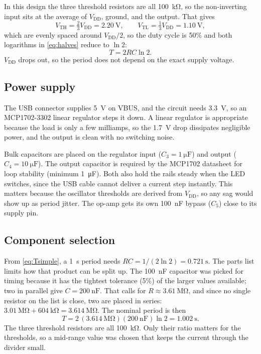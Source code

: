 \documentclass[11pt]{article}
\newcommand{\Vdd}{V_{\text{DD}}}
\newcommand{\Vth}{V_{\text{TH}}}
\newcommand{\Vtl}{V_{\text{TL}}}
\begin{document}
In this design the three threshold resistors are all \qty{100}{\kilo\ohm},
so the non-inverting input sits at the average of $\Vdd$, ground, and the
output. That gives
\begin{equation}
  \Vth = \tfrac{2}{3}\Vdd = \qty{2.20}{\volt}, \qquad
  \Vtl = \tfrac{1}{3}\Vdd = \qty{1.10}{\volt},
  \label{eq:thresholds}
\end{equation}
which are evenly spaced around $\Vdd/2$, so the duty cycle is
50\% and both logarithms in \cref{eq:halves} reduce to
$\ln 2$:
\begin{equation}
  T = 2RC\ln 2 .
  \label{eq:Tsimple}
\end{equation}
$\Vdd$ drops out, so the period does not depend on the exact supply
voltage.

\subsection{Power supply}
\label{sec:power}
The USB connector supplies \qty{5}{\volt} on VBUS, and the circuit needs
\qty{3.3}{\volt}, so an MCP1702-3302 linear regulator steps it down. A
linear regulator is appropriate because the load is only a few
milliamps, so the \qty{1.7}{\volt} drop dissipates negligible power, and
the output is clean with no switching noise.

Bulk capacitors are placed on the regulator input ($C_3 =
\qty{1}{\micro\farad}$) and output ($C_4 = \qty{10}{\micro\farad}$). The
output capacitor is required by the MCP1702 datasheet for loop stability
(minimum \qty{1}{\micro\farad}). Both also hold the rails steady when the
LED switches, since the USB cable cannot deliver a current step instantly.
This matters because the oscillator thresholds are derived from $\Vdd$,
so any sag would show up as period jitter. The op-amp gets its own
\qty{100}{\nano\farad} bypass ($C_5$) close to its supply pin.

\subsection{Component selection}
\label{sec:components}
From \cref{eq:Tsimple}, a \qty{1}{\s} period needs $RC = 1/(2\ln 2) =
\qty{0.721}{\s}$. The parts list limits how that product can be split up.
The \qty{100}{\nano\farad} capacitor was picked for timing because it has
the tightest tolerance (5\%) of the larger values available;
two in parallel give $C = \qty{200}{\nano\farad}$. That calls for
$R \approx \qty{3.61}{\mega\ohm}$, and since no single resistor on the list
is close, two are placed in series: $\qty{3.01}{\mega\ohm} +
\qty{604}{\kilo\ohm} = \qty{3.614}{\mega\ohm}$. The nominal period is then
\begin{equation}
  T = 2\,(\qty{3.614}{\mega\ohm})(\qty{200}{\nano\farad})\ln 2
    = \qty{1.002}{\s}.
  \label{eq:Tnominal}
\end{equation}
The three threshold resistors are all \qty{100}{\kilo\ohm}. Only their ratio
matters for the thresholds, so a mid-range value was chosen that keeps the
current through the divider small.
\end{document}
